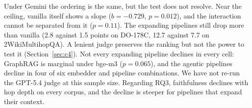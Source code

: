 Under Gemini the ordering is the same, but the test does not resolve.
Near the ceiling, vanilla itself shows a slope ($b = -0.729$,
$p = 0.012$), and the interaction cannot be separated from it
($p = 0.11$). The expanding pipelines still drop more than vanilla (2.8
against 1.5 points on DO-178C, 12.7 against 7.7 on 2WikiMultihopQA). A lenient judge preserves the ranking but not the power to test it
(Section~\ref{sec:c4}). Not every expanding pipeline declines in every cell: GraphRAG is
marginal under bge-m3 ($p = 0.065$), and the agentic pipelines decline
in four of six embedder and pipeline combinations. We have not re-run the GPT-5.4
judge at this sample size. Regarding RQ3, faithfulness declines with
hop depth on every corpus, and the decline is steeper for pipelines
that expand their context.



